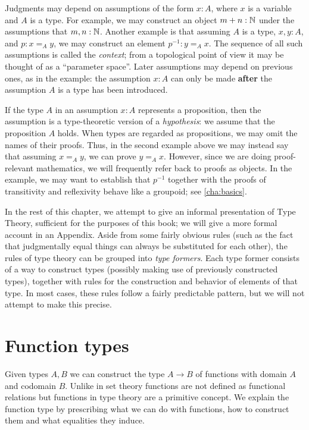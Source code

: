 Judgments may depend on assumptions of the form $x:A$, where $x$ is a variable and $A$ is a type.
For example, we may construct an object $m + n : \mathbb{N}$ under the assumptions that $m,n : \mathbb{N}$.
Another example is that assuming $A$ is a type, $x,y : A$, and $p : x =_A y$, we may construct an element $p^{-1} : y =_A x$.
The sequence of all such assumptions is called the \emph{context}; from a topological point of view it may be thought of as a ``parameter space''.
Later assumptions may depend on previous ones, as in the example: the assumption $x:A$ can only be made \textbf{after} the assumption $A$ is a type has been introduced.

If the type $A$ in an assumption $x:A$ represents a proposition, then the assumption is a type-theoretic version of a \emph{hypothesis}: we assume that the proposition $A$ holds.
When types are regarded as propositions, we may omit the names of their proofs.
Thus, in the second example above we may instead say that assuming $x =_A y$, we can prove $y =_A x$.
However, since we are doing proof-relevant mathematics, we will frequently refer back to proofs as objects.
In the example, we may want to establish that $p^{-1}$ together with the proofs of transitivity and reflexivity behave like a groupoid; see \autoref{cha:basics}.

In the rest of this chapter, we attempt to give an informal presentation of Type Theory, sufficient for the purposes of this book; we will give a more formal account in an Appendix.
Aside from some fairly obvious rules (such as the fact that judgmentally equal things can always be substituted for each other), the rules of type theory can be grouped into \emph{type formers}.
Each type former consists of a way to construct types (possibly making use of previously constructed types), together with rules for the construction and behavior of elements of that type.
In most cases, these rules follow a fairly predictable pattern, but we will not attempt to make this precise.


\section{Function types}
\label{sec:function-types}

Given types $A,B$ we can construct the type $A \to B$ of functions with domain $A$
and codomain $B$. Unlike in set theory functions are not defined as
functional relations but functions in type theory are a primitive
concept. We explain the function type by prescribing what we can do with functions, 
how to construct them and what equalities they induce.

